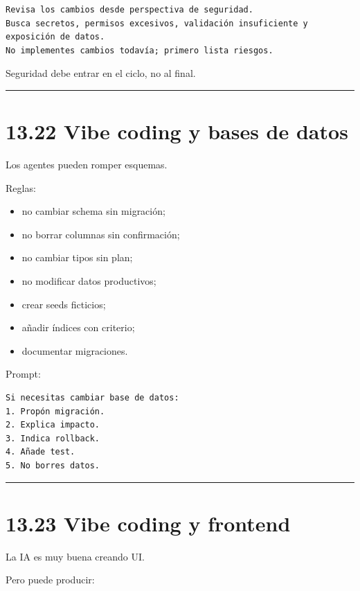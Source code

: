 \begin{lstlisting}
Revisa los cambios desde perspectiva de seguridad.
Busca secretos, permisos excesivos, validación insuficiente y exposición de datos.
No implementes cambios todavía; primero lista riesgos.
\end{lstlisting}

Seguridad debe entrar en el ciclo, no al final.

\begin{center}\rule{0.5\linewidth}{0.5pt}\end{center}

\section{13.22 Vibe coding y bases de
datos}\label{vibe-coding-y-bases-de-datos}

Los agentes pueden romper esquemas.

Reglas:

\begin{itemize}
\tightlist
\item
  no cambiar schema sin migración;
\item
  no borrar columnas sin confirmación;
\item
  no cambiar tipos sin plan;
\item
  no modificar datos productivos;
\item
  crear seeds ficticios;
\item
  añadir índices con criterio;
\item
  documentar migraciones.
\end{itemize}

Prompt:

\begin{lstlisting}
Si necesitas cambiar base de datos:
1. Propón migración.
2. Explica impacto.
3. Indica rollback.
4. Añade test.
5. No borres datos.
\end{lstlisting}

\begin{center}\rule{0.5\linewidth}{0.5pt}\end{center}

\section{13.23 Vibe coding y frontend}\label{vibe-coding-y-frontend}

La IA es muy buena creando UI.

Pero puede producir:

